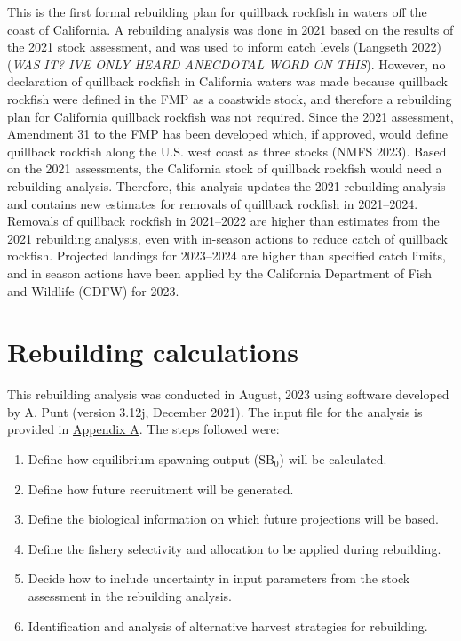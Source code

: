 \documentclass[11pt,
  letterpaper,
]{article}
\begin{document}
This is the first formal rebuilding plan for quillback rockfish in waters off the coast of California. A rebuilding analysis was done in 2021 based on the results of the 2021 stock assessment, and was used to inform catch levels (Langseth 2022) (\emph{WAS IT? IVE ONLY HEARD ANECDOTAL WORD ON THIS}). However, no declaration of quillback rockfish in California waters was made because quillback rockfish were defined in the FMP as a coastwide stock, and therefore a rebuilding plan for California quillback rockfish was not required. Since the 2021 assessment, Amendment 31 to the FMP has been developed which, if approved, would define quillback rockfish along the U.S. west coast as three stocks (NMFS 2023). Based on the 2021 assessments, the California stock of quillback rockfish would need a rebuilding analysis. Therefore, this analysis updates the 2021 rebuilding analysis and contains new estimates for removals of quillback rockfish in 2021--2024. Removals of quillback rockfish in 2021--2022 are higher than estimates from the 2021 rebuilding analysis, even with in-season actions to reduce catch of quillback rockfish. Projected landings for 2023--2024 are higher than specified catch limits, and in season actions have been applied by the California Department of Fish and Wildlife (CDFW) for 2023.

\hypertarget{rebuilding-calculations}{%
\section{Rebuilding calculations}\label{rebuilding-calculations}}

This rebuilding analysis was conducted in August, 2023 using software developed by A. Punt (version 3.12j, December 2021). The input file for the analysis is provided in \protect\hyperlink{append_a}{Appendix A}. The steps followed were:

\begin{enumerate}
    \item Define how equilibrium spawning output ($\text{SB}_0$) will be calculated. 
    \item Define how future recruitment will be generated.
    \item Define the biological information on which future projections will be based.
    \item Define the fishery selectivity and allocation to be applied during rebuilding. 
    \item Decide how to include uncertainty in input parameters from the stock assessment in the rebuilding analysis. 
    \item Identification and analysis of alternative harvest strategies for rebuilding. 
\end{enumerate}
\end{document}
